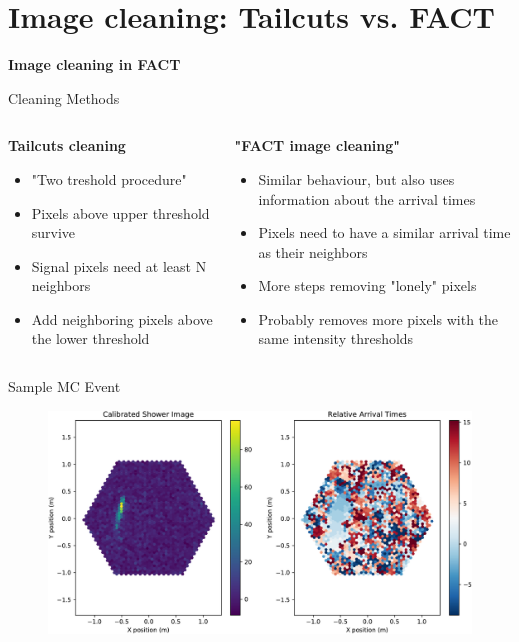\section{Image cleaning: Tailcuts vs. FACT}

\begin{frame}
    \centering
    {\Huge \textbf{Image cleaning in FACT}}
\end{frame}

\begin{frame}{Cleaning Methods}
    \begin{columns}[T] %
        \begin{column}{.48\textwidth}
            \textbf{Tailcuts cleaning}
            \vspace{8pt}
            \begin{itemize}
                \item "Two treshold procedure"
                \item Pixels above upper threshold survive
                \item Signal pixels need at least N neighbors
                \item Add neighboring pixels above the lower threshold
            \end{itemize}
        \end{column}
        \begin{column}{.48\textwidth}
            \textbf{"FACT image cleaning"}
            \vspace{8pt}
            \begin{itemize}
                \item Similar behaviour, but also uses information about the arrival times
                \item Pixels need to have a similar arrival time as their neighbors
                \item More steps removing "lonely" pixels
                \item[\rightarrow] Probably removes more pixels with the same intensity thresholds
            \end{itemize}
        \end{column}
    \end{columns}
\end{frame}

\begin{frame}{Sample MC Event}
    \begin{figure}
        \includegraphics[width=0.85\linewidth]{images/cleaning_plots/raw-crop.pdf}
    \end{figure}
\end{frame}



